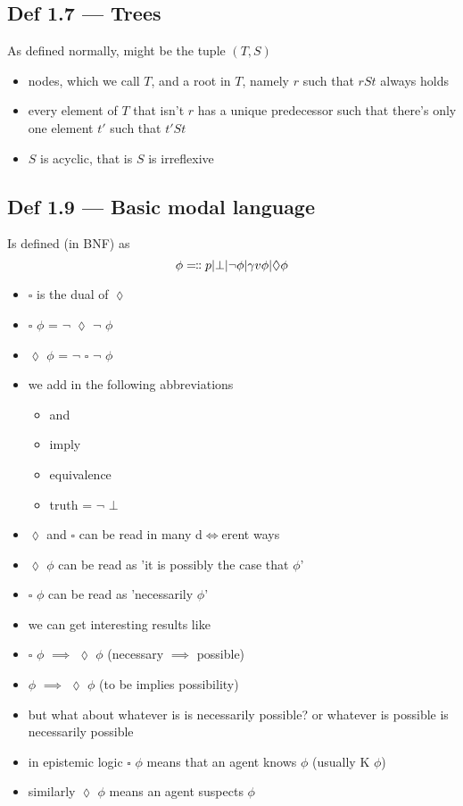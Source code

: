 \documentclass[10pt, a4paper, twoside]{article}
\begin{document}
\subsection{Def 1.7 --- Trees}
As defined normally, might be the tuple $(T, S)$
\begin{itemize}
  \item nodes, which we call $T$, and a root in $T$, namely $r$ such that $rSt$ always holds
  \item every element of $T$ that isn’t $r$ has a unique predecessor such that there's only one element $t'$ such that $t'St$
  \item $S$ is acyclic, that is $S$ is irreflexive
\end{itemize}

\subsection{Def 1.9 --- Basic modal language}
Is defined (in BNF) as
\[
\phi \Eqqcolon p | \bot | \neg \phi | \gamma v \phi | \lozenge \phi
\]

\begin{itemize}
  \item $\square$ is the dual of $\lozenge$
  \item $\square$ $\phi$ = $\neg$ $\lozenge$ $\neg$ $\phi$
  \item $\lozenge$ $\phi$ = $\neg$ $\square$ $\neg$ $\phi$
  \item we add in the following abbreviations
  \begin{itemize}
    \item and
    \item imply
    \item equivalence
    \item truth = $\neg$ $\bot$
  \end{itemize}
\end{itemize}
\begin{itemize}
  \item $\lozenge$ and $\square$ can be read in many d$\iff$erent ways
  \item $\lozenge$ $\phi$ can be read as 'it is possibly the case that $\phi$'
  \item $\square$ $\phi$ can be read as 'necessarily $\phi$'
  \item we can get interesting results like

  \item $\square$ $\phi$ $\implies$ $\lozenge$ $\phi$ (necessary $\implies$ possible)

  \item $\phi$ $\implies$ $\lozenge$ $\phi$ (to be implies possibility)
  \item but what about whatever is is necessarily possible? or whatever is possible is necessarily possible
  \item in epistemic logic $\square$ $\phi$ means that an agent knows $\phi$ (usually K $\phi$)
  \item similarly $\lozenge$ $\phi$ means an agent suspects $\phi$
\end{itemize}
\end{document}

